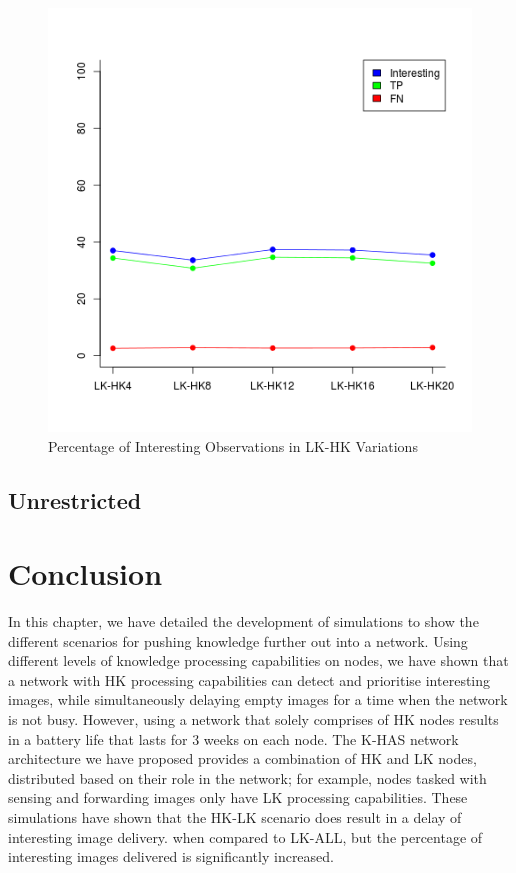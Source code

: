 \begin{figure}[!h]
\centering
\includegraphics[width=\textwidth]{Chap7/figures/khas_int_percent.png}
\caption{Percentage of Interesting Observations in LK-HK Variations}
\label{fig:khas_int_percent}
\end{figure}

\subsection{Unrestricted}

\section{Conclusion}
	
In this chapter, we have detailed the development of simulations to show the different scenarios for pushing knowledge further out into a network. Using different levels of knowledge processing capabilities on nodes, we have shown that a network with HK processing capabilities can detect and prioritise interesting images, while simultaneously delaying empty images for a time when the network is not busy. However, using a network that solely comprises of HK nodes results in a battery life that lasts for 3 weeks on each node. The K-HAS network architecture we have proposed provides a combination of HK and LK nodes, distributed based on their role in the network; for example, nodes tasked with sensing and forwarding images only have LK processing capabilities. These simulations have shown that the HK-LK scenario does result in a delay of interesting image delivery. when compared to LK-ALL, but the percentage of interesting images delivered is significantly increased.

